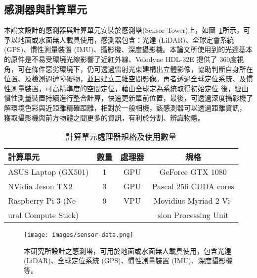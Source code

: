 \subsection{感測器與計算單元}

本論文設計的感測器與計算單元安裝於感測塔(Sensor Tower)上，如圖~\ref{figure:sensor-tower}所示，可予以地面或水面無人載具使用，感測器包含：光達 (LiDAR)、全球定會系統 (GPS)、慣性測量裝置 (IMU)、攝影機、深度攝影機。本論文所使用到的光達基本的原件是不易受環境光線影響了近紅外線、Velodyne HDL-32E 提供了 360度視角，可在條件惡劣環境下，仍可透過雷射光束建構出立體影像，協助判斷自身所在位置、及檢測週遭障礙物，並且建立三維空間影像。再者透過全球定位系統、及慣性測量裝置，可高精準度的空間定位，藉由全球定為系統取得初始定位 後，經由慣性測量裝置持續進行整合計算，快速更新單前位置，最後，可透過深度攝影機了解環境色彩與近距離精確距離，相對於一般相機，該感測器可以透過距離資訊， 獲取攝影機與前方物體之間更多的資訊，有利於分割、辨識物體。

\begin{table}[bht]
\vspace{0.2cm}
\caption[計算單元列表]{計算單元處理器規格及使用數量}
	\centering
	\begin{tabular} {|l|c|c|c|}
		\hline
		計算單元 				& 數量 		& 處理器 	& 規格 \\
		\hline
		ASUS Laptop (GX501) 			& 1 		& GPU 		& GeForce GTX 1080 \\
		\hline
		NVidia Jeson TX2 				& 3 		& GPU 		& Pascal 256 CUDA cores \\
		\hline
		Raspberry Pi 3 (Ne-		& 9			& VPU 		& Movidius Myriad 2 Vi-\\
		ural Compute Stick)		&			&			& sion Processing Unit \\
		\hline
	\end{tabular}
	\label{table:computation_units}
\end{table}

\begin{figure}[tb]
  \centering
    \texttt{[image: images/sensor-data.png]}
        \caption{本研究所設計之感測塔，可用於地面或水面無人載具使用，包含光達 (LiDAR)、全球定位系統 (GPS)、慣性測量裝置 (IMU)、深度攝影機等。}
 \label{figure:sensor-tower}
\end{figure}


